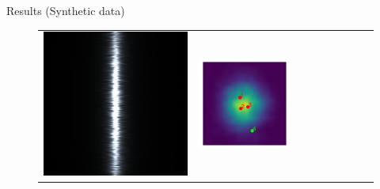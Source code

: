 \documentclass[final]{beamer}
\newlength{\twocolwid}
\newlength{\resultwidth}
\begin{document}
\begin{frame}[t]
\begin{columns}[t]
\begin{column}{\twocolwid}
\begin{block}{Results (Synthetic data)}
\begin{figure}[t]
\begin{tabular}{ccrclcccc}
            		\includegraphics[width=\resultwidth]{images/synth/metal/optim.jpg} &
            		\includegraphics[width=\resultwidth]{images/synth/metal/posterior.pdf} &

\end{tabular}
\end{figure}
\end{block}
\end{column}
\end{columns}
\end{frame}
\end{document}
